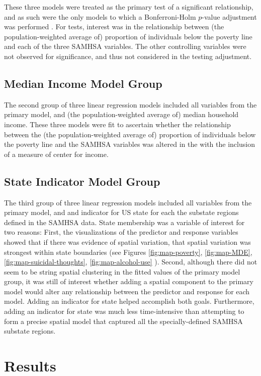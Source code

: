 \documentclass{article}
\begin{document}
These three models were treated as the primary test
of a significant relationship,
and as such were the only models to which a Bonferroni-Holm
$p$-value adjustment was performed \cite{holm}.
For tests, interest was in the relationship between
(the population-weighted average of)
proportion of individuals below the poverty line
and each of the three SAMHSA variables.
The other controlling variables were not
observed for significance,
and thus not considered in the testing adjustment.


\subsection{Median Income Model Group}

The second group of three linear regression models included all variables
from the primary model,
and
(the population-weighted average of)
median household income.
These three models were fit to ascertain whether
the relationship between the
(the population-weighted average of)
proportion of individuals below the poverty line
and the SAMHSA variables was altered in the
with the inclusion of a measure of center for income.

\subsection{State Indicator Model Group}

The third group of three linear regression models included all variables
from the primary model,
and and indicator for US state for each the
substate regions defined in the SAMHSA data.
State membership was a variable of interest for two
reasons:
First, the visualizations of the predictor and response variables
showed that if there was evidence of spatial variation,
that spatial variation was strongest within state boundaries
(see Figures
\ref{fig:map-poverty},
\ref{fig:map-MDE},
\ref{fig:map-suicidal-thoughts},
\ref{fig:map-alcohol-use}
).
Second, although there did not seem to be string spatial
clustering in the fitted values of the primary model group,
it was still of interest whether adding a spatial component to
the primary model would alter any relationship between
the predictor and response for each model.
Adding an indicator for state helped accomplish both goals.
Furthermore, adding an indicator for state was much less
time-intensive than attempting to form a precise spatial model
that captured all the specially-defined SAMHSA substate regions.


\section{Results}
\end{document}
